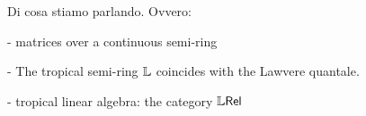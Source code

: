 Di cosa stiamo parlando. Ovvero:

- matrices over a continuous semi-ring

- The tropical semi-ring $\mathbb{L}$ coincides with the Lawvere quantale. 

- tropical linear algebra: the category $\mathbb{L}\mathsf{Rel}$